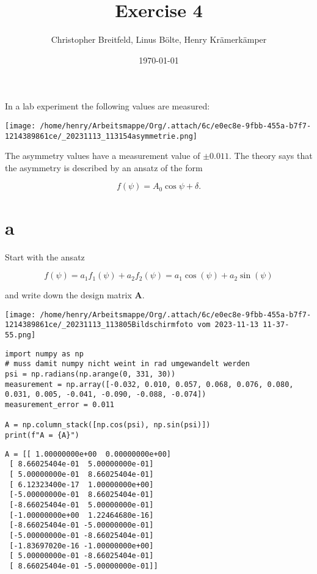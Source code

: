 \documentclass[11pt]{article}
\author{Christopher Breitfeld, Linus Bölte, Henry Krämerkämper}
\date{\today}
\title{Exercise 4}
\begin{document}
\maketitle
\setlength{\parindent}{0pt}


In a lab experiment the following values are measured:

\begin{center}
\texttt{[image: /home/henry/Arbeitsmappe/Org/.attach/6c/e0ec8e-9fbb-455a-b7f7-1214389861ce/\_20231113\_113154asymmetrie.png]}
\end{center}


The asymmetry values have a measurement value of \(\pm0.011\). The theory says that the
asymmetry is described by an ansatz of the form

\begin{equation*}
   f(\psi) = A_{0} \cos{\psi + \delta}.
\end{equation*}
\section{a}
\label{sec:org1e5cb15}
Start with the ansatz

\begin{equation*}
   f(\psi) = a_{1} f_{1}(\psi) + a_{2} f_{2} (\psi) = a_{1} \cos(\psi) + a_{2} \sin{(\psi)}
\end{equation*}

and write down the design matrix \textbf{A}.

\begin{center}
\texttt{[image: /home/henry/Arbeitsmappe/Org/.attach/6c/e0ec8e-9fbb-455a-b7f7-1214389861ce/\_20231113\_113805Bildschirmfoto vom 2023-11-13 11-37-55.png]}
\end{center}

\begin{verbatim}
import numpy as np
# muss damit numpy nicht weint in rad umgewandelt werden
psi = np.radians(np.arange(0, 331, 30))
measurement = np.array([-0.032, 0.010, 0.057, 0.068, 0.076, 0.080, 0.031, 0.005, -0.041, -0.090, -0.088, -0.074])
measurement_error = 0.011

A = np.column_stack([np.cos(psi), np.sin(psi)])
print(f"A = {A}")
\end{verbatim}

\begin{verbatim}
A = [[ 1.00000000e+00  0.00000000e+00]
 [ 8.66025404e-01  5.00000000e-01]
 [ 5.00000000e-01  8.66025404e-01]
 [ 6.12323400e-17  1.00000000e+00]
 [-5.00000000e-01  8.66025404e-01]
 [-8.66025404e-01  5.00000000e-01]
 [-1.00000000e+00  1.22464680e-16]
 [-8.66025404e-01 -5.00000000e-01]
 [-5.00000000e-01 -8.66025404e-01]
 [-1.83697020e-16 -1.00000000e+00]
 [ 5.00000000e-01 -8.66025404e-01]
 [ 8.66025404e-01 -5.00000000e-01]]
\end{verbatim}
\end{document}
